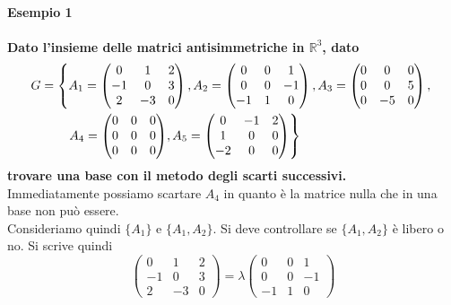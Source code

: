 \subsection{}%

\subsubsection{}%

\paragraph{Esempio 1}%

\textbf{Dato l'insieme delle matrici antisimmetriche in $\mathbb{R}^3$, dato}
\begin{align*}
  G &= \left\{
    A_1=
    \begin{pmatrix}
      0 & 1 & 2\\
      -1 & 0 & 3\\
      2 & -3 & 0
    \end{pmatrix},
    A_2=
    \begin{pmatrix}
      0 & 0 & 1\\
      0 & 0 & -1\\
      -1 & 1 & 0
    \end{pmatrix},
    A_3=
    \begin{pmatrix}
      0 & 0 & 0\\
      0 & 0 & 5\\
      0 & -5 & 0
    \end{pmatrix},\right.\\
    &\qquad\left.
    A_4=
    \mqty(\zmat{3}{3}),
    A_5=
    \begin{pmatrix}
      0 & -1 & 2\\
      1 & 0 & 0\\
      -2 & 0 & 0
    \end{pmatrix}
  \right\}
\end{align*}
\textbf{trovare una base con il metodo degli scarti successivi.}\\
Immediatamente possiamo scartare $A_4$ in quanto è la matrice nulla che in una base non
può essere.\\
Consideriamo quindi $\{A_1\}$ e $\{A_1,A_2\}$. Si deve controllare se $\{A_1,A_2\}$ è
libero o no. Si scrive quindi
\begin{equation*}
  \begin{pmatrix}
    0 & 1 & 2\\
    -1 & 0 & 3\\
    2 & -3 & 0
  \end{pmatrix} =
  \lambda
  \begin{pmatrix}
    0 & 0 & 1\\
    0 & 0 & -1\\
    -1 & 1 & 0
  \end{pmatrix}
\end{equation*}
